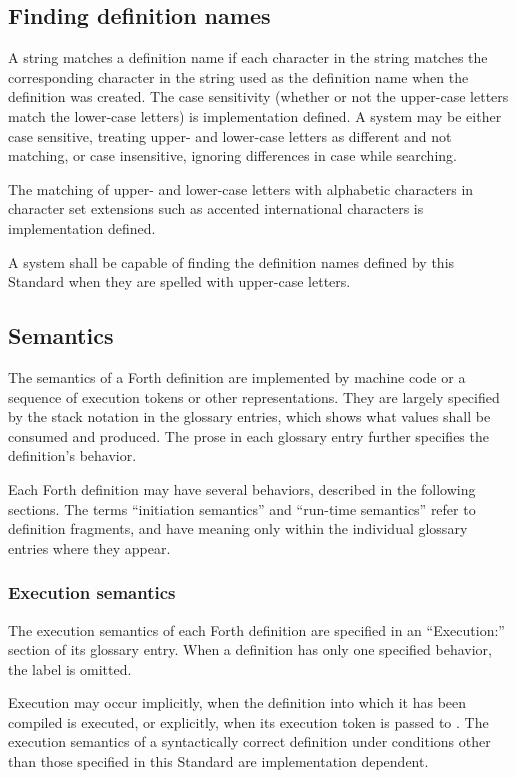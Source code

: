 \subsection{Finding definition names} %
\label{usage:find}

A string matches a definition name if each character in the string
matches the corresponding character in the string used as the
definition name when the definition was created. The case
sensitivity (whether or not the upper-case letters match the
lower-case letters) is implementation defined. A system may be
either case sensitive, treating upper- and lower-case letters as
different and not matching, or case insensitive, ignoring
differences in case while searching.

The matching of upper- and lower-case letters with alphabetic
characters in character set extensions such as accented
international characters is implementation defined.

A system shall be capable of finding the definition names defined
by this Standard when they are spelled with upper-case letters.


\subsection{Semantics} %
\label{usage:semantics}

The semantics of a Forth definition are implemented by machine code
or a sequence of execution tokens or other representations. They are
largely specified by the stack notation in the glossary entries,
which shows what values shall be consumed and produced. The prose in
each glossary entry further specifies the definition's behavior.

Each Forth definition may have several behaviors, described in the
following sections. The terms ``initiation semantics'' and
``run-time semantics'' refer to definition fragments, and have
meaning only within the individual glossary entries where they
appear.

\subsubsection{Execution semantics} %

The execution semantics of each Forth definition are specified in an
``\textsf{Execution:}'' section of its glossary entry. When a
definition has only one specified behavior, the label is omitted.

Execution may occur implicitly, when the definition into which it
has been compiled is executed, or explicitly, when its execution
token is passed to . The execution semantics of a
syntactically correct definition under conditions other than those
specified in this Standard are implementation dependent.

